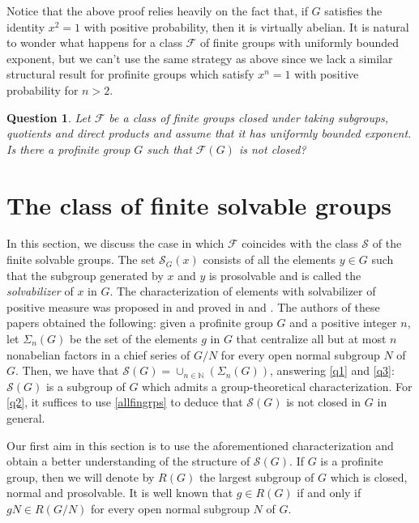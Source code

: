 \documentclass{amsart}
\newtheorem{question}[thm]{Question} \newtheorem{con}[thm]{Conjecture}
\numberwithin{equation}{section}
\begin{document}
Notice that the above proof relies heavily on the fact that, if $G$ satisfies the identity $x^2=1$ with positive probability, then it is virtually abelian. It is natural to wonder what happens for a class $\mathcal F$ of finite groups with uniformly bounded exponent, but we can't use the same strategy as above since we lack a similar structural result for profinite groups which satisfy $x^n=1$ with positive probability for $n>2$.

\begin{question}
    Let $\mathcal F$ be a class of finite groups closed under taking subgroups, quotients and direct products and assume that it has uniformly bounded exponent. Is there a profinite group $G$ such that $\mathcal F(G)$ is not closed?
\end{question}

\section{The class of finite solvable groups}\label{solv}

In this section, we discuss the case in which $\mathcal F$
coincides with the class $\mathcal S$ of the finite solvable groups. The set $\mathcal S_G(x)$ consists of all the  elements $y\in G$ such that the subgroup generated by $x$ and $y$ is prosolvable and is called the \emph{solvabilizer} of $x$ in $G.$ The characterization of elements with solvabilizer  of positive measure was proposed in \cite[Conjecture 1]{solv} and proved in \cite[Theorem 6]{solv} and \cite[Corollary 1.3]{fgg}. {The authors of these papers} obtained the following: given a profinite group $G$ and a positive integer $n$, let $\Sigma_n(G)$ be the set of the elements $g$ in $G$  that centralize all but at most $n$ nonabelian factors in a chief series of $G/N$ for every open normal subgroup $N$ of $G.$ Then, we have that $\mathcal S(G)=\cup_{n\in \mathbb N}(\Sigma_n(G))$, answering \cref{q1} and \cref{q3}: $\mathcal{S}(G)$ is a subgroup of $G$ which admits a group-theoretical characterization. For \cref{q2}, it suffices to use \cref{allfingrps} to deduce that $\mathcal{S}(G)$ is not closed in $G$ in general.

Our first aim in this section is to use the aforementioned characterization and obtain a better understanding of the structure of $\mathcal S(G).$ If $G$ is a profinite group, then we will denote by $R(G)$ the largest subgroup of $G$ which is closed, normal and prosolvable. It is well known that $g\in R(G)$ if and only if $gN\in R(G/N)$ for every open normal subgroup $N$ of $G.$
\end{document}
